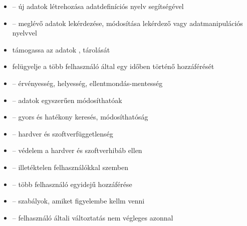 \documentclass[main.tex]{subfiles}
\begin{document}
  \begin{itemize}
    \item {} – új adatok létrehozása adatdefiníciós
    nyelv segítségével
    
    \item {} – meglévő adatok lekérdezése, módosítása
    lekérdező vagy adatmanipulációs nyelvvel

    \item támogassa az adatok ,
     tárolását

    \item felügyelje a több felhasználó által egy
    időben történő hozzáférését

    \item {} \tabto{4.5cm} – \tabto{5.5cm}
    érvényesség, helyesség, ellentmondás-mentesség
    
    \item {} \tabto{4.5cm} – \tabto{5.5cm}
    adatok egyszerűen módosíthatóak
    
    \item {} \tabto{4.5cm} – \tabto{5.5cm}
    gyors és hatékony keresés, módosíthatóság
    
    \item {} \tabto{4.5cm} – \tabto{5.5cm}
    hardver és szoftverfüggetlenség
    
    \item {} \tabto{4.5cm} – \tabto{5.5cm}
    védelem a hardver és szoftverhibáb ellen
    
    \item {} \tabto{4.5cm} – \tabto{5.5cm}
    illetéktelen felhasználókkal szemben
    
    \item {} \tabto{4.5cm} – \tabto{5.5cm}
    több felhasználó egyidejű hozzáférése

    \item {} \tabto{5cm} – \tabto{5.5cm}
    szabályok, amiket figyelembe kellm venni

    \item {} \tabto{4.5cm} – \tabto{5.5cm}
    felhasználó általi változtatás nem végleges azonnal
  \end{itemize}
\end{document}
